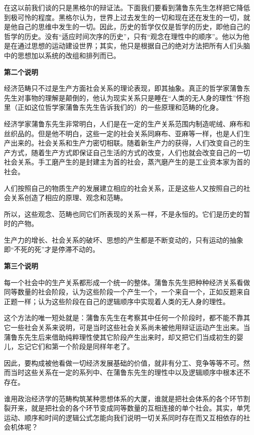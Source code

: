 \documentclass[a4paper,twoside,12pt,AutoFakeBold]{ctexart}
\begin{document}
在这以前我们谈的只是黑格尔的辩证法。下面我们要看到蒲鲁东先生怎样把它降低到极可怜的程度。黑格尔认为，世界上过去发生的一切和现在还在发生的一切，就是他自己的思维中发生的一切。因此，历史的哲学仅仅是哲学的历史，即他自己的哲学的历史。没有“适应时间次序的历史”，只有“观念在理性中的顺序”。他以为他是在通过思想的运动建设世界；其实，他只是根据自己的绝对方法把所有人们头脑中的思想加以系统的改组和排列而已。

\begin{center}
    \textbf{第二个说明}
\end{center}

经济范畴只不过是生产方面社会关系的理论表现，即其抽象。真正的哲学家蒲鲁东先生对事物的理解是颠倒的，他认为现实关系只是睡在“人类的无人身的理性”怀抱里（正如这位哲学家蒲鲁东先生告诉我们的）的一些原理和范畴的化身。

经济学家蒲鲁东先生非常明白，人们是在一定的生产关系范围内制造呢绒、麻布和丝织品的。但是他不明白，这些一定的社会关系同麻布、亚麻等一样，也是人们生产出来的。社会关系和生产力密切相联。随着新生产力的获得，人们改变自己的生产方式，随着生产方式即保证自己生活的方式的改变，人们也就会改变自己的一切社会关系。手工磨产生的是封建主为首的社会，蒸汽磨产生的是工业资本家为首的社会。

人们按照自己的物质生产的发展建立相应的社会关系，正是这些人又按照自己的社会关系创造了相应的原理、观念和范畴。

所以，这些观念、范畴也同它们所表现的关系一样，不是永恒的。它们是历史的暂时的产物。

生产力的增长、社会关系的破坏、思想的产生都是不断变动的，只有运动的抽象即“不死的死”才是停滞不动的。

\begin{center}
    \textbf{第三个说明}
\end{center}

每一个社会中的生产关系都形成一个统一的整体。蒲鲁东先生把种种经济关系看做同等数量的社会阶段，认为这些阶段一个产生一个，一个来自一个，正如反题来自正题一样；认为这些阶段在自己的逻辑顺序中实现着人类的无人身的理性。

这个方法的唯一短处就是：蒲鲁东先生在考察其中任何一个阶段时，都不能不靠其它一些社会关系来说明，可是当时这些社会关系尚未被他用辩证运动产生出来。当蒲鲁东先生后来借助纯粹理性使其它阶段产生出来时，却又把它们当成初生的婴儿，忘记它们和第一个阶段是同样年老了。

因此，要构成被他看做一切经济发展基础的价值，就非有分工、竞争等等不可。然而当时这些关系在一定的系列中、在蒲鲁东先生的理性中以及逻辑顺序中根本还不存在。

谁用政治经济学的范畴构筑某种思想体系的大厦，谁就是把社会体系的各个环节割裂开来，就是把社会的各个环节变成同等数量的互相连接的单个社会。其实，单凭运动、顺序和时间的逻辑公式怎能向我们说明一切关系同时存在而又互相依存的社会机体呢？
\end{document}
